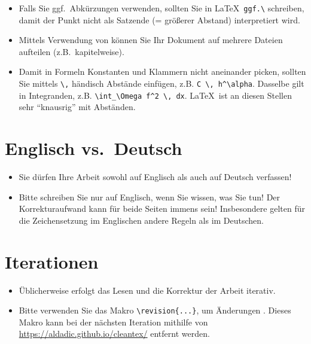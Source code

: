 \begin{itemize}
  \item Falls Sie ggf.\ Abkürzungen verwenden, sollten Sie in \LaTeX\ \verb$ggf.\$ schreiben, damit der Punkt nicht als Satzende (= größerer Abstand) interpretiert wird.

  \item Mittels Verwendung von \verb$$ können Sie Ihr Dokument auf mehrere Dateien aufteilen (z.B.\ kapitelweise).

  \item Damit in Formeln Konstanten und Klammern nicht aneinander picken, sollten Sie mittels \verb$\,$ händisch Abstände einfügen, z.B. \verb$C \, h^\alpha$. Dasselbe gilt in Integranden, z.B. \verb$\int_\Omega f^2 \, dx$. \LaTeX\ ist an diesen Stellen sehr "`knausrig"' mit Abständen.
\end{itemize}

\section{Englisch vs.\ Deutsch}

\begin{itemize}

  \item Sie dürfen Ihre Arbeit sowohl auf Englisch als auch auf Deutsch verfassen!

  \item Bitte schreiben Sie nur auf Englisch, wenn Sie wissen, was Sie tun! Der Korrekturaufwand kann für beide Seiten immens sein! Insbesondere gelten für die Zeichensetzung im Englischen andere Regeln als im Deutschen.

\end{itemize}

\section{Iterationen}

\begin{itemize}

  \item Üblicherweise erfolgt das Lesen und die Korrektur der Arbeit iterativ.
  \item Bitte verwenden Sie das Makro \verb$\revision{...}$, um Änderungen .
  Dieses Makro kann bei der nächsten Iteration mithilfe von \url{https://aldadic.github.io/cleantex/} entfernt werden.

\end{itemize}

